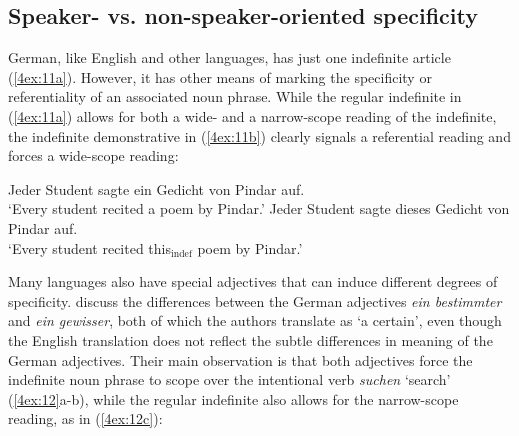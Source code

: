 \documentclass[output=paper]{langsci/langscibook}
\begin{document}
\subsection{Speaker- vs. non-speaker-oriented specificity}\label{4sec:22}

German, like English and other languages, has just one indefinite article (\ref{4ex:11a}). However, it has other means of marking the specificity or referentiality of an associated noun phrase. While the regular indefinite in (\ref{4ex:11a}) allows for both a wide- and a narrow-scope reading of the indefinite, the indefinite demonstrative in (\ref{4ex:11b}) clearly signals a referential reading and forces a wide-scope reading:

\begin{exe}
\ex\label{4ex:11}
	\begin{xlista}
	\ex\label{4ex:11a}
	Jeder Student sagte ein Gedicht von Pindar auf. \\
	`Every student recited a poem by Pindar.'
	\ex\label{4ex:11b}
	Jeder Student sagte dieses Gedicht von Pindar auf. \\
	`Every student recited this$_{\text{indef}}$ poem by Pindar.'
	\end{xlista}
\end{exe}

Many languages also have special adjectives that can induce different degrees of specificity. \cite[][31]{ebert:etal:13} discuss the differences between the German adjectives {\emph{ein bestimmter}} and {\emph{ein gewisser}}, both of which the authors translate as `a certain', even though the English translation does not reflect the subtle differences in meaning of the German adjectives. Their main observation is that both adjectives force the indefinite noun phrase to scope over the intentional verb {\emph{suchen}} `search' (\ref{4ex:12}a-b), while the regular indefinite also allows for the narrow-scope reading, as in (\ref{4ex:12c}):
\end{document}
